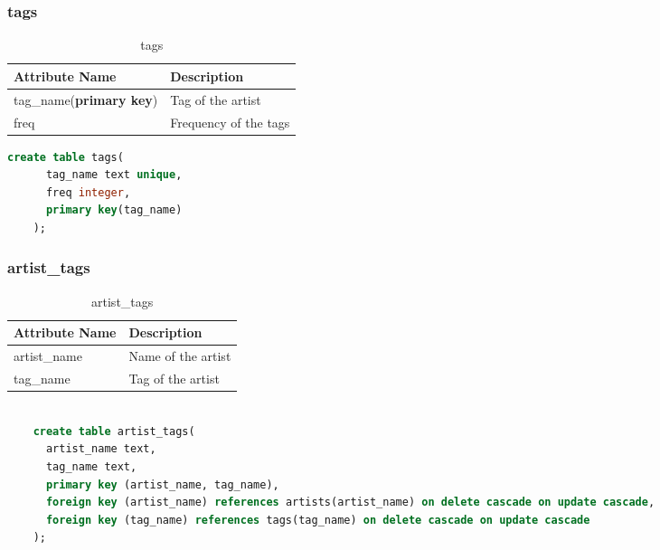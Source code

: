 \documentclass[10pt]{article}
\begin{document}
\subsubsection{tags}
\label{sec:1.3.3}
\begin{table}[!ht]
    \centering
    \begin{tabular}{|l|l|}
         \hline
         \textbf{Attribute Name} & \textbf{Description} \\
         \hline
         tag\_name(\textbf{primary key}) & Tag of the artist  \\
         \hline
         freq &  Frequency of the tags\\
         \hline
    \end{tabular}
    \caption{tags}
    \label{tab:my_label3}
\end{table}

\begin{lstlisting}[language=SQL,
        deletekeywords={IDENTITY,INT},
        morekeywords={clustered},    
        framesep=10pt,
        framextopmargin=10pt]
    create table tags(
      tag_name text unique,
      freq integer,
      primary key(tag_name)
    );
\end{lstlisting}

\subsubsection{artist\_tags}
\label{sec:1.3.4}
\begin{table}[!ht]
    \centering
    \begin{tabular}{|l|l|}
         \hline
         \textbf{Attribute Name} & \textbf{Description} \\
         \hline
         artist\_name & Name of the artist  \\
         \hline
         tag\_name &  Tag of the artist\\
         \hline
    \end{tabular}
    \caption{artist\_tags}
    \label{tab:my_label4}
\end{table}

\begin{lstlisting}[language=SQL,
        deletekeywords={IDENTITY,INT},
        morekeywords={clustered},    
        framesep=10pt,
        framextopmargin=10pt]

    create table artist_tags(
      artist_name text,
      tag_name text,
      primary key (artist_name, tag_name), 
      foreign key (artist_name) references artists(artist_name) on delete cascade on update cascade,
      foreign key (tag_name) references tags(tag_name) on delete cascade on update cascade
    );

\end{lstlisting}
\end{document}
